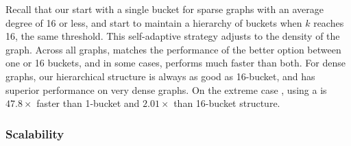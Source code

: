 Recall that our \HBS{} start with a single bucket for sparse graphs with an average degree of 16 or less,
and start to maintain a hierarchy of buckets when $k$ reaches 16, the same threshold.
This self-adaptive strategy adjusts to the density of the graph.
Across all graphs, \HBS{} matches the performance of the better option between one or 16 buckets, 
and in some cases, performs much faster than both.
For dense graphs, our hierarchical structure is always as good as 16-bucket, 
and has superior performance on very dense graphs. On the extreme case \HCNS{}, using a \HBS{} is
$47.8\times$ faster than 1-bucket and $2.01\times$ than 16-bucket structure.


\subsubsection{Scalability}


